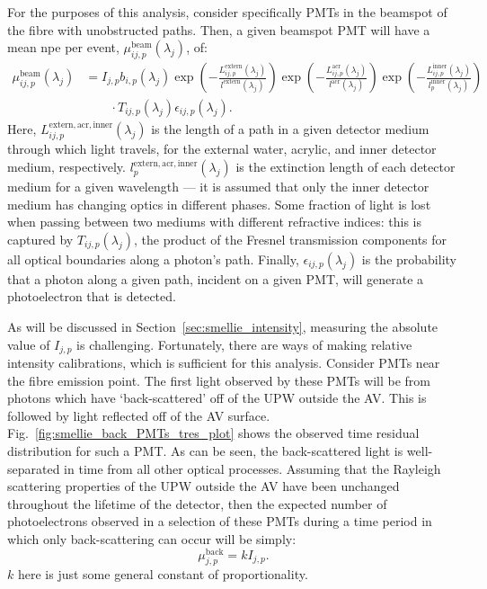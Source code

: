 For the purposes of this analysis, consider specifically PMTs in the beamspot of the fibre with unobstructed paths. Then, a given beamspot PMT will have a mean npe per event, $\mu_{ij,p}^{\mathrm{beam}}(\lambda_{j})$, of:
\begin{align}\label{eq:smellie_ext_length_theory}
    \mu_{ij,p}^{\mathrm{beam}}(\lambda_{j}) &= I_{j,p}b_{i,p}(\lambda_{j})
    \exp\left(
        -\frac{L_{ij,p}^{\mathrm{extern}}(\lambda_{j})}{l^{\mathrm{extern}}(\lambda_{j})}
    \right)
    \exp\left(
        -\frac{L_{ij,p}^{\mathrm{acr}}(\lambda_{j})}{l^{\mathrm{acr}}(\lambda_{j})}
    \right)
    \exp\left(
        -\frac{L_{ij,p}^{\mathrm{inner}}(\lambda_{j})}{l_{p}^{\mathrm{inner}}(\lambda_{j})}
    \right)\nonumber\\
    & \qquad\cdot T_{ij,p}(\lambda_{j})\epsilon_{ij,p}(\lambda_{j}).
\end{align}
Here, $L_{ij,p}^{\mathrm{extern,acr,inner}}(\lambda_{j})$ is the length of a path in a given detector medium through which light travels, for the external water, acrylic, and inner detector medium, respectively. $l_{p}^{\mathrm{extern,acr,inner}}(\lambda_{j})$ is the extinction length of each detector medium for a given wavelength --- it is assumed that only the inner detector medium has changing optics in different phases. Some fraction of light is lost when passing between two mediums with different refractive indices: this is captured by $T_{ij,p}(\lambda_{j})$, the product of the Fresnel transmission components for all optical boundaries along a photon's path. Finally, $\epsilon_{ij,p}(\lambda_{j})$ is the probability that a photon along a given path, incident on a given PMT, will generate a photoelectron that is detected. 

As will be discussed in Section~\ref{sec:smellie_intensity}, measuring the absolute value of $I_{j,p}$ is challenging. Fortunately, there are ways of making relative intensity calibrations, which is sufficient for this analysis. Consider PMTs near the fibre emission point. The first light observed by these PMTs will be from photons which have `back-scattered' off of the UPW outside the AV. This is followed by light reflected off of the AV surface. Fig.~\ref{fig:smellie_back_PMTs_tres_plot} shows the observed time residual distribution for such a PMT. As can be seen, the back-scattered light is well-separated in time from all other optical processes. Assuming that the Rayleigh scattering properties of the UPW outside the AV have been unchanged throughout the lifetime of the detector, then the expected number of photoelectrons observed in a selection of these PMTs during a time period in which only back-scattering can occur will be simply:
\begin{equation}
    \mu_{j,p}^{\mathrm{back}} = kI_{j,p}.
\end{equation}
$k$ here is just some general constant of proportionality.

